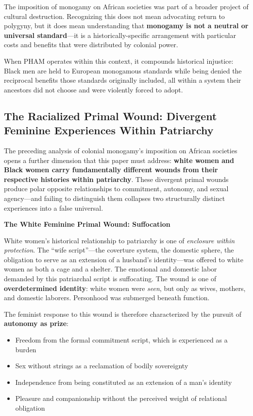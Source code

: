 \documentclass[12pt,openany]{book}
\numberwithin{equation}{chapter}
\begin{document}
The imposition of monogamy on African societies was part of a broader project of cultural destruction. Recognizing this does not mean advocating return to polygyny, but it does mean understanding that \textbf{monogamy is not a neutral or universal standard}---it is a historically-specific arrangement with particular costs and benefits that were distributed by colonial power.

When PHAM operates within this context, it compounds historical injustice: Black men are held to European monogamous standards while being denied the reciprocal benefits those standards originally included, all within a system their ancestors did not choose and were violently forced to adopt.

\subsection{The Racialized Primal Wound: Divergent Feminine Experiences Within Patriarchy}

The preceding analysis of colonial monogamy's imposition on African societies opens a further dimension that this paper must address: \textbf{white women and Black women carry fundamentally different wounds from their respective histories within patriarchy}. These divergent primal wounds produce polar opposite relationships to commitment, autonomy, and sexual agency---and failing to distinguish them collapses two structurally distinct experiences into a false universal.

\textbf{The White Feminine Primal Wound: Suffocation}

White women's historical relationship to patriarchy is one of \textit{enclosure within protection}. The ``wife script''---the coverture system, the domestic sphere, the obligation to serve as an extension of a husband's identity---was offered to white women as both a cage and a shelter. The emotional and domestic labor demanded by this patriarchal script is suffocating. The wound is one of \textbf{overdetermined identity}: white women were \textit{seen}, but only as wives, mothers, and domestic laborers. Personhood was submerged beneath function.

The feminist response to this wound is therefore characterized by the pursuit of \textbf{autonomy as prize}:

\begin{itemize}
    \item Freedom from the formal commitment script, which is experienced as a burden
    \item Sex without strings as a reclamation of bodily sovereignty
    \item Independence from being constituted as an extension of a man's identity
    \item Pleasure and companionship without the perceived weight of relational obligation
\end{itemize}
\end{document}
